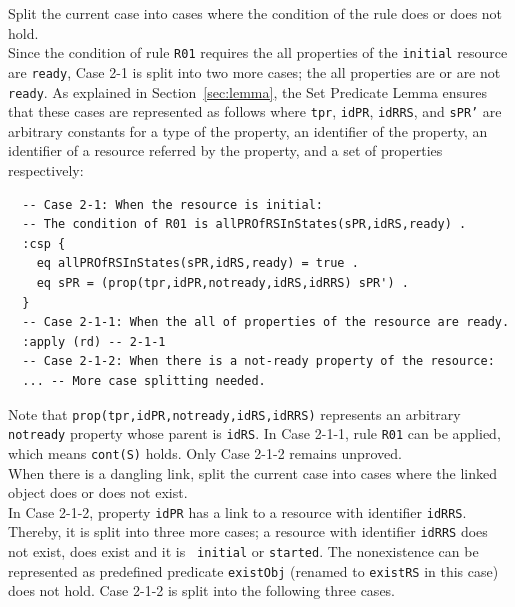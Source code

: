 \documentclass[12pt]{report}
\newcommand{\stt}[1]{{\small{\tt {#1}}}}
\begin{document}
 Split the current case into cases where
the condition of the rule does or does not hold. \\
Since the condition of rule {\tt R01} requires the all properties of the
{\tt initial} resource are {\tt ready}, Case 2-1 is split into two
more cases; the all properties are or are not {\tt ready}. As explained in
Section~\ref{sec:lemma}, the Set Predicate Lemma ensures that these cases are
represented as follows where {\tt tpr}, {\tt idPR}, {\tt idRRS}, and
{\tt sPR'} are arbitrary constants for a type of the property, an
identifier of the property, an identifier of a resource referred by
the property, and a set of properties respectively:
\small
\begin{verbatim}
  -- Case 2-1: When the resource is initial:
  -- The condition of R01 is allPROfRSInStates(sPR,idRS,ready) .
  :csp { 
    eq allPROfRSInStates(sPR,idRS,ready) = true .
    eq sPR = (prop(tpr,idPR,notready,idRS,idRRS) sPR') .
  }
  -- Case 2-1-1: When the all of properties of the resource are ready.
  :apply (rd) -- 2-1-1
  -- Case 2-1-2: When there is a not-ready property of the resource:
  ... -- More case splitting needed.
\end{verbatim}
\normalsize
Note that \stt{prop(tpr,idPR,notready,idRS,idRRS)} represents an
arbitrary {\tt notready} property whose parent is {\tt idRS}. In Case
2-1-1, rule {\tt R01} can be applied, which means \stt{cont(S)} holds. Only
Case 2-1-2 remains unproved.\\

 When there is a dangling link, split the
current case into cases where the linked object does or does not
exist. \\
In Case 2-1-2, property {\tt idPR} has a link to a resource with identifier
{\tt idRRS}. Thereby, it is split into three more cases; a resource
with identifier {\tt idRRS} does not exist, does exist and it is {\tt
  initial} or {\tt started}. The nonexistence can be represented as
predefined predicate {\tt existObj} (renamed to {\tt existRS} in this
case) does not hold. Case 2-1-2 is split into the following three
cases.
\end{document}
